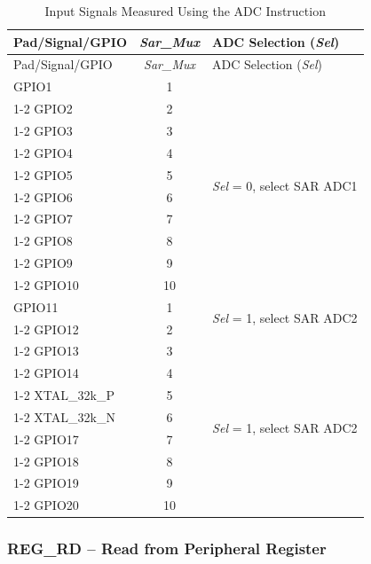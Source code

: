 \documentclass[main\_\_EN.tex]{subfiles}
\begin{document}
\begin{longtable}{ |p{4cm}|c|p{4cm}| }
    \caption{Input Signals Measured Using the ADC Instruction}
    \label{table:adc inputs1}
    \\\hline
    \rowcolor{lightgray}
    Pad/Signal/GPIO & \textit{Sar\_Mux} & ADC Selection (\textit{Sel}) \\\hline
    \endfirsthead
    \hline
    \rowcolor{lightgray}
    Pad/Signal/GPIO \ & \textit{Sar\_Mux} & ADC Selection (\textit{Sel})  \\\hline
    \endhead
    \hline
    \endfoot
    GPIO1    &  1  & \multirow{10}{*}{\textit{Sel} = 0, select SAR ADC1} \\ \cline{1-2}
    GPIO2  &  2  & \\ \cline{ 1-2 }
    GPIO3  &  3  & \\ \cline{1-2}
    GPIO4  &  4  & \\ \cline{1-2}
    GPIO5  &  5  & \\ \cline{1-2}
    GPIO6  &  6  & \\ \cline{1-2}
    GPIO7  &  7  & \\ \cline{1-2}
    GPIO8  &  8  & \\ \cline{1-2}
    GPIO9  &  9  & \\ \cline{1-2}
    GPIO10  &  10  & \\ \hline
    GPIO11    &  1  & \multirow{2}{*}{\textit{Sel} = 1, select SAR ADC2} \\ \cline{1-2}
    GPIO12  &  2  & \\ \cline{1-2}
    GPIO13  &  3  & \multirow{8}{*}{\textit{Sel} = 1, select SAR ADC2}\\ \cline{1-2}
    GPIO14  &  4  & \\ \cline{1-2}
    XTAL\_32k\_P  &  5  & \\ \cline{1-2}
    XTAL\_32k\_N  &  6  & \\ \cline{1-2}
    GPIO17  &  7  & \\ \cline{1-2}
    GPIO18  &  8  & \\ \cline{1-2}
    GPIO19  &  9  & \\ \cline{1-2}
    GPIO20                 &  10  &
\end{longtable}

\vspace{-2em}
\subsubsection{REG\_RD – Read from Peripheral Register} \label{subsection:REG_RD}
\end{document}
